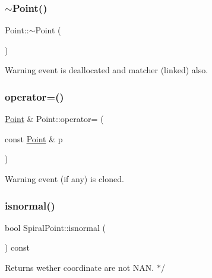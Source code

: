 \subsubsection{\texorpdfstring{$\sim$Point()}{~Point()}}
{\footnotesize\ttfamily Point\+::$\sim$\+Point (\begin{DoxyParamCaption}{ }\end{DoxyParamCaption})}

\begin{DoxyWarning}{Warning}
event is deallocated and matcher (linked) also. 
\end{DoxyWarning}
\mbox{\label{group__segment_ga55eeab949e62268da63176d48570eb54}} 
\subsubsection{\texorpdfstring{operator=()}{operator=()}}
{\footnotesize\ttfamily \mbox{\hyperlink{classPoint}{Point}} \& Point\+::operator= (\begin{DoxyParamCaption}\item[{const \mbox{\hyperlink{classPoint}{Point}} \&}]{p }\end{DoxyParamCaption})\hspace{0.3cm}{\ttfamily [virtual]}}

\begin{DoxyWarning}{Warning}
event (if any) is cloned. 
\end{DoxyWarning}
\mbox{\label{group__segment_ga8d702bcd74b30d19929d1954087bd4b0}} 
\subsubsection{\texorpdfstring{isnormal()}{isnormal()}}
{\footnotesize\ttfamily bool Spiral\+Point\+::isnormal (\begin{DoxyParamCaption}{ }\end{DoxyParamCaption}) const}

\begin{DoxyReturn}{Returns}
wether coordinate are not N\+AN. $\ast$/ 
\end{DoxyReturn}
\mbox{\label{group__segment_ga71dccd6f3dd14b2c497e4198ea37d745}} 
